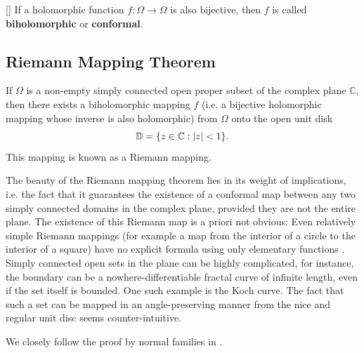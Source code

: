 \begin{definition} \label{def:ConformalMap} [{\cite[Chap. 8]{SteinShakarchi2003_complexanalysis}}]
    If a holomorphic function $f: \Omega \to\Omega$ is also bijective, then $f$ is called \textbf{biholomorphic} or \textbf{conformal}.
\end{definition}


\subsection{Riemann Mapping Theorem}

\begin{theorem}\label{thm:RiemannMappingTheorem}
    If $\Omega$ is a non-empty simply connected open proper subset of the complex plane $\mathbb{C}$, then there exists a biholomorphic mapping $f$ (i.e. a bijective holomorphic mapping whose inverse is also holomorphic) from $\Omega$ onto the open unit disk
    $$ \mathbb{D} = \{z \in \mathbb{C}: |z|<1 \}. $$
    This mapping is known as a Riemann mapping.
\end{theorem}

The beauty of the Riemann mapping theorem lies in its weight of implications, i.e. the fact that it guarantees the existence of a conformal map between any two simply connected domains in the complex plane, provided they are not the entire plane. The existence of this Riemann map is a priori not obvious: Even relatively simple Riemann mappings (for example a map from the interior of a circle to the interior of a square) have no explicit formula using only elementary functions \cite{Wegmann2005_num_methods_confmapping}.
Simply connected open sets in the plane can be highly complicated, for instance, the boundary can be a nowhere-differentiable fractal curve of infinite length, even if the set itself is bounded. One such example is the Koch curve. The fact that such a set can be mapped in an angle-preserving manner from the nice and regular unit disc seems counter-intuitive.


We closely follow the proof by normal families in \cite{SteinShakarchi2003_complexanalysis}.

